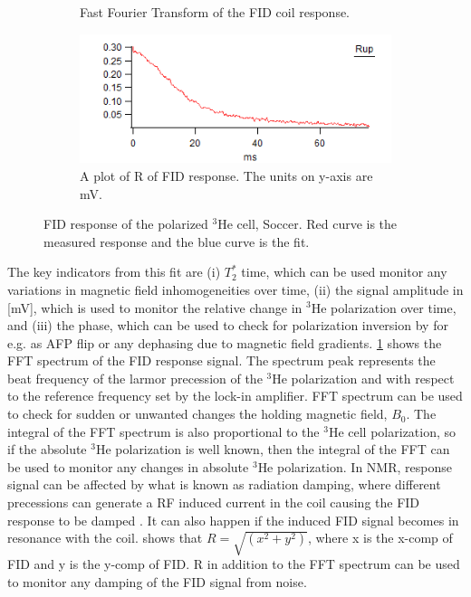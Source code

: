 {\begin{figure}
\begin{subfigure}[b]{0.5\textwidth}
        \caption{Fast Fourier Transform of the FID coil response.}    
        \label{fig:FIDFFT}
    \end{subfigure}
    \hfill
    \begin{subfigure}[b]{0.5\textwidth}   
        \centering 
        \includegraphics[width=\textwidth]{figures/chapter3-figs/rup_graph.png}
        \caption{A plot of R of FID response. The units on y-axis are mV.}    
        \label{fig:FIDr}
    \end{subfigure}
    \caption{FID response of the polarized $^3$He cell, Soccer. Red curve is the measured response and the blue curve is the fit.}
    \label{fig:FIDsignals}
\end{figure}
\clearpage}

The key indicators from this fit are (i) $T_2^*$ time, which can be used monitor any variations in magnetic field inhomogeneities over time, (ii) the signal amplitude in [mV], which is used to monitor the relative change in $^3$He polarization over time, and (iii) the phase, which can be used to check for polarization inversion by for e.g. as AFP flip or any dephasing due to magnetic field gradients. \cref{fig:FIDFFT} shows the FFT spectrum of the FID response signal. The spectrum peak represents the beat frequency of the larmor precession of the $^3$He polarization and with respect to the reference frequency set by the lock-in amplifier. FFT spectrum can be used to check for sudden or unwanted changes the holding magnetic field, $B_0$. The integral of the FFT spectrum is also proportional to the $^3$He cell polarization, so if the absolute $^3$He polarization is well known, then the integral of the FFT can be used to monitor any changes in absolute $^3$He polarization. In NMR, response signal can be affected by what is known as radiation damping, where different precessions can generate a RF induced current in the coil causing the FID response to be damped \cite{Augustine2002}. It can also happen if the induced FID signal becomes in resonance with the coil.  shows that $R=\sqrt{(x^2 + y^2)}$, where x is the x-comp of FID and y is the y-comp of FID. R in addition to the FFT spectrum can be used to monitor any damping of the FID signal from noise.

